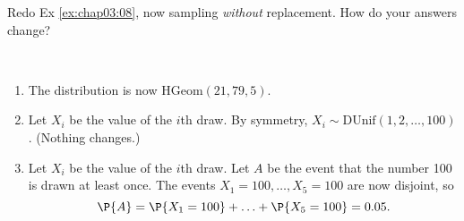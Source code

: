 \begin{exercise}
	Redo Ex \ref{ex:chap03:08}, now sampling \emph{without} replacement. How do your answers change?
 	\begin{solution}~
 		\begin{enumerate}
	 		\item The distribution is now $\text{HGeom}(21, 79, 5)$.
	 		\item Let $X_i$ be the value of the $i$th draw. By symmetry, $X_i \sim \text{DUnif}(1, 2, \ldots, 100)$. (Nothing changes.)
	 		\item Let $X_i$ be the value of the $i$th draw. Let $A$ be the event that the number 100 is drawn at least once. The events $X_1 = 100, \ldots, X_5 = 100$ are now disjoint, so
	 			\begin{equation*}
	 				\P{A} = \P{X_1 = 100} + \hdots + \P{X_5 = 100} = 0.05.
	 			\end{equation*}
	 	\end{enumerate}
 	\end{solution}
\end{exercise}
 	
